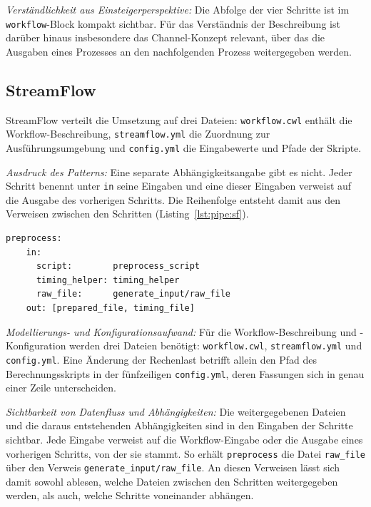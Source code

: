 \emph{Verständlichkeit aus Einsteigerperspektive:} Die Abfolge der
vier Schritte ist im \texttt{workflow}-Block kompakt sichtbar. Für das
Verständnis der Beschreibung ist darüber hinaus insbesondere das
Channel-Konzept relevant, über das die Ausgaben eines Prozesses an
den nachfolgenden Prozess weitergegeben werden.

\subsection{StreamFlow}
\label{sec:lokal:pipeline:streamflow}

StreamFlow verteilt die Umsetzung auf drei Dateien:
\texttt{workflow.cwl} enthält die Workflow-Beschreibung,
\texttt{streamflow.yml} die Zuordnung zur Ausführungsumgebung und
\texttt{config.yml} die Eingabewerte und Pfade der Skripte.

\emph{Ausdruck des Patterns:} Eine separate Abhängigkeitsangabe gibt
es nicht. Jeder Schritt benennt unter \texttt{in} seine Eingaben und
eine dieser Eingaben verweist auf die Ausgabe des vorherigen
Schritts. Die Reihenfolge entsteht damit aus den Verweisen zwischen
den Schritten (Listing~\ref{lst:pipe:sf}).

\begin{lstlisting}[caption={Verweis auf die Ausgabe des Vorgängers in workflow.cwl (StreamFlow, Pipeline)},label={lst:pipe:sf}]
  preprocess:
    in:
      script:        preprocess_script
      timing_helper: timing_helper
      raw_file:      generate_input/raw_file
    out: [prepared_file, timing_file]
\end{lstlisting}

\emph{Modellierungs- und Konfigurationsaufwand:} Für die
Workflow-Beschreibung und -Konfiguration werden drei Dateien
benötigt: \texttt{workflow.cwl}, \texttt{streamflow.yml} und
\texttt{config.yml}. Eine Änderung der Rechenlast betrifft allein
den Pfad des Berechnungsskripts in der fünfzeiligen
\texttt{config.yml}, deren Fassungen sich in genau einer Zeile
unterscheiden.

\emph{Sichtbarkeit von Datenfluss und Abhängigkeiten:} Die
weitergegebenen Dateien und die daraus entstehenden Abhängigkeiten
sind in den Eingaben der Schritte sichtbar. Jede Eingabe verweist
auf die Workflow-Eingabe oder die Ausgabe eines vorherigen Schritts,
von der sie stammt. So erhält \texttt{preprocess} die Datei
\texttt{raw\_file} über den Verweis
\texttt{generate\_input/raw\_file}. An diesen Verweisen lässt sich
damit sowohl ablesen, welche Dateien zwischen den Schritten
weitergegeben werden, als auch, welche Schritte voneinander
abhängen.


